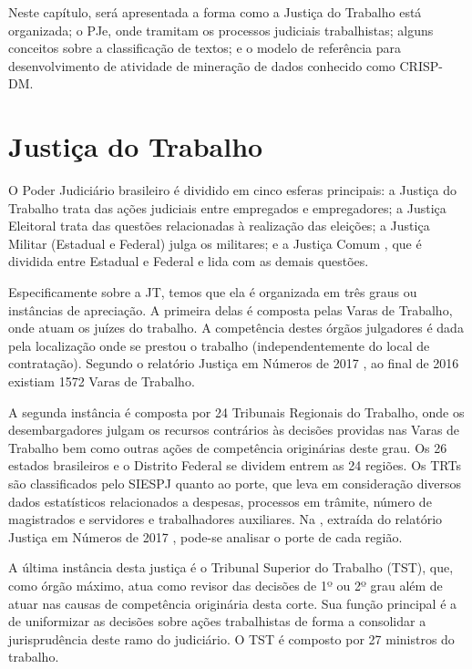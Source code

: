 \label{cap:ReferencialTeorico}%
Neste capítulo, será apresentada a forma como a Justiça do Trabalho está organizada; o PJe, onde tramitam os processos judiciais trabalhistas; alguns conceitos sobre a classificação de textos; e o modelo de referência para desenvolvimento de atividade de mineração de dados conhecido como CRISP-DM. 

\section{\label{sec:justicaDoTrabalho}Justiça do Trabalho}%

O Poder Judiciário brasileiro é dividido em cinco esferas principais: a Justiça do Trabalho  trata das ações judiciais entre empregados e empregadores; a Justiça Eleitoral trata das questões relacionadas à  realização das eleições;  a Justiça Militar (Estadual e Federal)  julga os militares; e a Justiça Comum , que é dividida entre Estadual e Federal e lida com as demais questões. 

Especificamente sobre a JT, temos que ela é organizada em três graus ou instâncias de apreciação. A primeira delas é composta pelas Varas de Trabalho, onde atuam os juízes do trabalho. A competência destes órgãos julgadores é dada pela localização onde se prestou o trabalho (independentemente do local de contratação). Segundo o relatório Justiça em Números de 2017 \cite{justicaemnumeros2017}, ao final de 2016 existiam 1572 Varas de Trabalho. 

A segunda instância é composta por 24 Tribunais Regionais do Trabalho, onde os desembargadores julgam os recursos contrários às decisões providas nas Varas de Trabalho bem como outras ações de competência originárias deste grau. Os 26 estados brasileiros e o Distrito Federal se dividem entrem as 24 regiões. Os TRTs são classificados pelo SIESPJ quanto ao porte, que leva em consideração diversos dados estatísticos relacionados a despesas, processos em trâmite, número de magistrados e servidores e trabalhadores auxiliares. Na , extraída do relatório Justiça em Números de 2017 \cite{justicaemnumeros2017}, pode-se analisar o porte de cada região. 

%

A última instância desta justiça é o Tribunal Superior do Trabalho (TST), que, como órgão máximo, atua como revisor das decisões de 1º ou 2º grau além de atuar nas causas de competência originária desta corte.  Sua função principal é a de uniformizar as decisões sobre ações trabalhistas de forma a consolidar a jurisprudência deste ramo do judiciário. O TST é composto por 27 ministros do trabalho.


